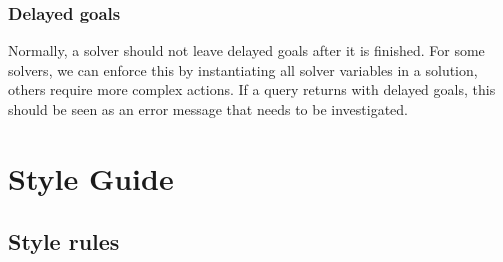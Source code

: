 \documentclass[a4paper,12pt]{report}
\begin{document}
\subsection{Delayed goals}
Normally, a solver should not leave delayed goals after it is finished. For some solvers, we can enforce this by instantiating all solver variables in a solution, others require more complex actions. If a query returns with delayed goals, this should be seen as an error message that needs to be investigated.
\appendix
\chapter{Style Guide}
\label{styleguide}

\section{Style rules}
\end{document}
